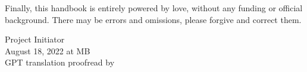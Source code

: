 Finally, this handbook is entirely powered by love, without any funding or official background. There may be errors and omissions, please forgive and correct them.

\begin{flushright}
    Project Initiator \KW \\
    August 18, 2022 at MB \\
    GPT translation proofread by \Shiyao
\end{flushright}


